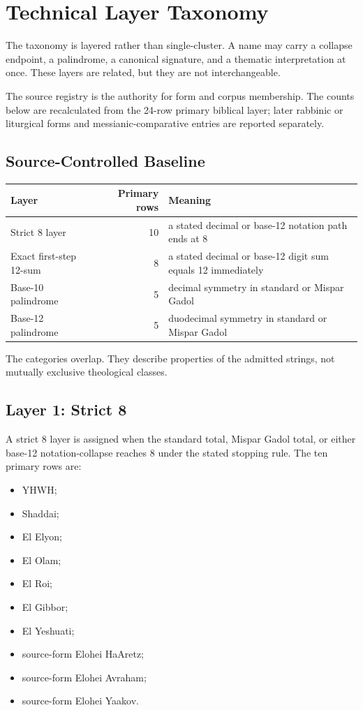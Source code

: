 \section{Technical Layer Taxonomy}

The taxonomy is layered rather than single-cluster. A name may carry a collapse endpoint, a palindrome, a canonical signature, and a thematic interpretation at once. These layers are related, but they are not interchangeable.

The source registry is the authority for form and corpus membership. The counts below are recalculated from the 24-row primary biblical layer; later rabbinic or liturgical forms and messianic-comparative entries are reported separately.

\subsection{Source-Controlled Baseline}

\begin{center}
\begin{tabular}{>{\raggedright\arraybackslash}p{3.4cm}r>{\raggedright\arraybackslash}p{9.0cm}}
\toprule
Layer & Primary rows & Meaning \\
\midrule
Strict 8 layer & 10 & a stated decimal or base-12 notation path ends at 8 \\
Exact first-step 12-sum & 8 & a stated decimal or base-12 digit sum equals 12 immediately \\
Base-10 palindrome & 5 & decimal symmetry in standard or Mispar Gadol \\
Base-12 palindrome & 5 & duodecimal symmetry in standard or Mispar Gadol \\
\bottomrule
\end{tabular}
\end{center}

The categories overlap. They describe properties of the admitted strings, not mutually exclusive theological classes.

\subsection{Layer 1: Strict 8}

A strict 8 layer is assigned when the standard total, Mispar Gadol total, or either base-12 notation-collapse reaches 8 under the stated stopping rule. The ten primary rows are:

\begin{itemize}
\item YHWH;
\item Shaddai;
\item El Elyon;
\item El Olam;
\item El Roi;
\item El Gibbor;
\item El Yeshuati;
\item source-form Elohei HaAretz;
\item source-form Elohei Avraham;
\item source-form Elohei Yaakov.
\end{itemize}

